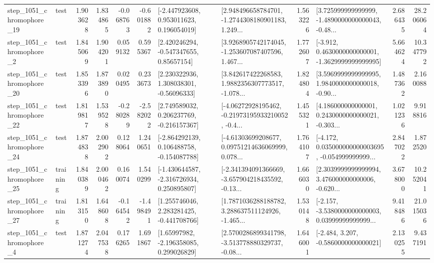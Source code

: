 \begin{tabular}{llrrrrllrlrr}
 step\_1051\_chromophore\_19 &      test &      1.903628 &    1.834865 &     -0.068763 & -0.601882 &    [-2.447923608, 0.953011623, 0.196054019] &  [2.948496658784701, -1.2744308180901183, 1.249... &       1.563226 &  [3.725999999999999, -1.4890000000000043, -0.48... &            2.686435 &         28.206064 \\
  step\_1051\_chromophore\_2 &      test &      1.845069 &    1.904201 &      0.059132 &  0.595367 &     [2.420246294, -0.547347655, 0.85657154] &  [3.9268905742174045, -1.253607087407596, 1.467... &       1.772607 &  [-3.912, 0.4630000000000001, -1.3629999999999995] &            5.664624 &         10.347792 \\
 step\_1051\_chromophore\_20 &      test &      1.853396 &    1.873890 &      0.020495 &  0.233673 &     [2.230322936, 1.308038301, -0.56096333] &  [3.842617422268583, 1.9882356307773517, -1.078... &       1.824804 &  [3.5969999999999995, 1.9840000000000018, -0.90... &            1.487362 &          2.160088 \\
 step\_1051\_chromophore\_22 &      test &      1.819817 &    1.539528 &     -0.280289 & -2.582022 &    [2.749589032, 0.206237769, -0.216157367] &  [-4.06272928195462, -0.21973195933210052, -0.4... &       1.455321 &  [4.186000000000001, 0.2430000000000021, -0.303... &            1.021236 &          9.918816 \\
 step\_1051\_chromophore\_24 &      test &      1.874838 &    2.002902 &      0.128064 &  1.240651 &   [-2.864292139, 0.106488758, -0.154087788] &  [-4.61303699208677, 0.09751214636069999, 0.078... &       1.764107 &  [-4.172, 0.035000000000003695, -0.054999999999... &            2.847022 &          1.872520 \\
 step\_1051\_chromophore\_25 &  training &      1.840389 &    2.000462 &      0.160074 &  1.540299 &   [-1.430644587, -2.316726934, 0.250895807] &  [-2.341394091366669, -3.657904218435592, -0.13... &       1.666030 &  [2.3039999999999994, 3.476000000000006, -0.620... &            3.678000 &         10.252041 \\
 step\_1051\_chromophore\_27 &  training &      1.813150 &    1.648608 &     -0.164542 & -1.498491 &    [1.255746046, 2.283281425, -0.441708766] &  [1.7871036288188782, 3.288637511124926, -1.465... &       1.530148 &  [-2.157, -3.5380000000000003, 0.03999999999999... &            9.418486 &         21.015036 \\
  step\_1051\_chromophore\_4 &      test &      1.871274 &    2.047538 &      0.176265 &  1.691867 &     [1.65997982, -2.196358085, 0.299026829] &  [2.5700286899341798, -3.513778880329737, -0.08... &       1.646001 &               [-2.484, 3.207, -0.5860000000000021] &            2.130255 &          9.437191 \\

\end{tabular}
